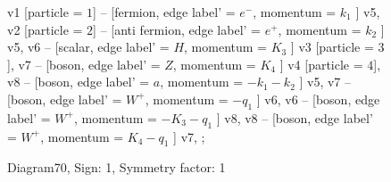 \documentclass{revtex4}
\begin{document}
\begin{figure}[!htb]
\begin{center}
{    %
v1 [particle = \(1\)] -- [fermion, edge label' = \(e^{-}\), momentum = \(k_{1}\) ] v5, 
v2 [particle = \(2\)] -- [anti fermion, edge label' = \(e^{+}\), momentum = \(k_{2}\) ] v5, 
v6 -- [scalar, edge label' = \(H\), momentum = \(K_{3}\) ] v3 [particle = \(3\)], 
v7 -- [boson, edge label' = \(Z\), momentum = \(K_{4}\) ] v4 [particle = \(4\)], 
v8 -- [boson, edge label' = \(a\), momentum = \(-k_{1} - k_{2}\) ] v5, 
v7 -- [boson, edge label' = \(W^{+}\), momentum = \(-q_{1}\) ] v6, 
v6 -- [boson, edge label' = \(W^{+}\), momentum = \(-K_{3} - q_{1}\) ] v8, 
v8 -- [boson, edge label' = \(W^{+}\), momentum = \(K_{4} - q_{1}\) ] v7, 
};
\end{center}
\caption{Diagram70, Sign: 1, Symmetry factor: 1}
\end{figure}
\newpage
\end{document}

